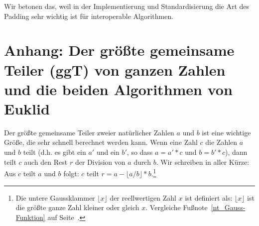 \begin{refsegment}
Wir betonen das, weil in der Implementierung und Standardisierung die Art
des Padding sehr wichtig ist für interoperable Algorithmen.




\hypertarget{nt:NumberTheory_Appendix_GCD}{}
\section[Anhang: Der ggT und die beiden Algorithmen von Euklid]
        {Anhang: Der größte gemeinsame Teiler (ggT) von ganzen Zahlen und die beiden
	 Algorithmen von Euklid\footnotemark}
\label{nt:NumberTheory_Appendix_GCD}

Der größte gemeinsame Teiler zweier natürlicher Zahlen $a$ und $b$ ist eine
wichtige Größe, die sehr schnell berechnet werden kann. Wenn eine Zahl $c$ die
Zahlen $a$ und $b$ teilt (d.h. es gibt ein $a'$ und ein $b'$, so dass
$a = a'*c$ und $b = b'*c$), dann teilt $c$ auch den Rest $r$ der Division von
$a$ durch $b$. Wir schreiben in aller Kürze:
Aus $c$ teilt $a$ und $b$ folgt:
$c$ teilt $r = a - \lfloor a/b \rfloor * b$.\footnote{\label{nt_Gauss-Klammer}%
Die untere Gaussklammer  $\lfloor x \rfloor $ der
reellwertigen Zahl $x$ ist definiert als: $\lfloor x \rfloor $ ist die größte
ganze Zahl kleiner oder gleich $x$.
Vergleiche Fußnote~\ref{nt_Gauss-Funktion} auf Seite~\pageref{nt_Gauss-Funktion}.
}


\end{refsegment}
